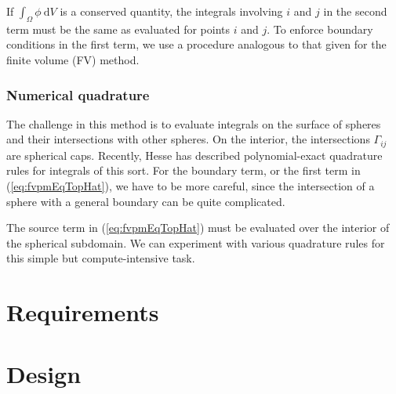 \documentclass[12pt]{article}
\newcommand{\labelSec}[1]{\label{sec:#1}}
\newcommand{\refEq}[1]{(\ref{eq:#1})}
\newcommand{\dV}{~\mathrm{d}V}
\begin{document}
If $\int_\Omega \phi \dV$ is a conserved quantity, the integrals involving $i$ and $j$ in the second term must be the same as evaluated for 
points $i$ and $j$. To enforce boundary conditions in the first term, we use a procedure analogous to that given for the finite volume (FV) method.

\subsubsection*{Numerical quadrature}

The challenge in this method is to evaluate integrals on the surface of spheres and their intersections with other spheres. On the interior, the 
intersections $\Gamma_{ij}$ are spherical caps. Recently, Hesse has described polynomial-exact quadrature rules for integrals of this sort\cite{Hesse2012}.
For the boundary term, or the first term in \refEq{fvpmEqTopHat}, we have to be more careful, since the intersection of a sphere with a general boundary can 
be quite complicated.

The source term in \refEq{fvpmEqTopHat} must be evaluated over the interior of the spherical subdomain. We can experiment with various 
quadrature rules for this simple but compute-intensive task.

\section{Requirements}\labelSec{Requirements}

\section{Design}\labelSec{Design}



\end{document}
